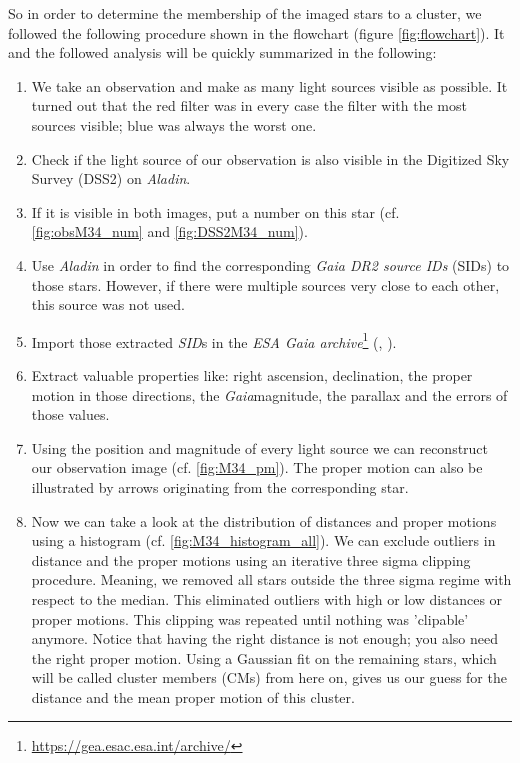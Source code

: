 \documentclass{article}
\begin{document}
So in order to determine the membership of the imaged stars to a cluster, we followed the following procedure shown in the flowchart (figure \ref{fig:flowchart}). It and the followed analysis will be quickly summarized in the following:

\begin{enumerate}
\item We take an observation and make as many light sources visible as possible. It turned out that the red filter was in every case the filter with the most sources visible; blue was always the worst one.
\item Check if the light source of our observation is also visible in the Digitized Sky Survey (DSS2) on \textit{Aladin}\cite{Boch2014}.
\item If it is visible in both images, put a number on this star (cf. \ref{fig:obsM34_num} and \ref{fig:DSS2M34_num}).
\item Use \textit{Aladin} in order to find the corresponding \textit{Gaia DR2 source IDs} (SIDs) to those stars. However, if there were multiple sources very close to each other, this source was not used.
\item Import those extracted \textit{SID}s in the \textit{ESA Gaia archive}\footnote{\url{https://gea.esac.esa.int/archive/}} (\cite{Gaia2016}, \cite{Gaia2018}).
\item Extract valuable properties like: right ascension, declination, the proper motion in those directions, the \textit{Gaia}magnitude, the parallax and the errors of those values.
\item Using the position and magnitude of every light source we can reconstruct our observation image (cf. \ref{fig:M34_pm}). The proper motion can also be illustrated by arrows originating from the corresponding star.
\item Now we can take a look at the distribution of distances and proper motions using a histogram (cf. \ref{fig:M34_histogram_all}). We can exclude outliers in distance and the proper motions using an iterative three sigma clipping procedure. Meaning, we removed all stars outside the three sigma regime with respect to the median. This eliminated outliers with high or low distances or proper motions. This clipping was repeated until nothing was 'clipable' anymore. Notice that having the right distance is not enough; you also need the right proper motion. Using a Gaussian fit on the remaining stars, which will be called cluster members (CMs) from here on, gives us our guess for the distance and the mean proper motion of this cluster.

\end{enumerate}
\end{document}
